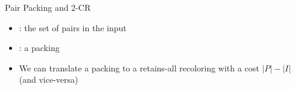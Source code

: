 \begin{frame}{Pair Packing and 2-CR}

\begin{itemize}

\item 
{}: the set of pairs in the input

\pause\item
{}: a packing

\pause\item 
We can translate a packing to a retains-all recoloring with a cost 
$|P| - |I|$ (and vice-versa) 

\end{itemize}

\end{frame}